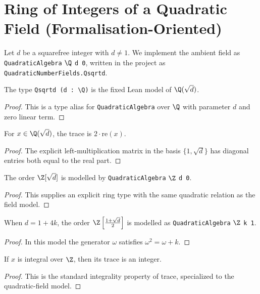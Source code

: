 \chapter{Ring of Integers of a Quadratic Field (Formalisation-Oriented)}

Let $d$ be a squarefree integer with $d \neq 1$.
We implement the ambient field as
\verb|QuadraticAlgebra| $\Q$ \verb|d 0|,
written in the project as \verb|QuadraticNumberFields.Qsqrtd|.

\begin{definition}\label{bp_qsqrtd}
  \leanok
  The type \verb|Qsqrtd (d : \Q)| is the fixed Lean model of $\Q(\sqrt{d})$.
\end{definition}
\begin{proof}
  This is a type alias for \verb|QuadraticAlgebra| over $\Q$ with parameter $d$
  and zero linear term.
\end{proof}

\begin{lemma}\label{bp_trace}
  \leanok
  For $x \in \Q(\sqrt{d})$, the trace is $2 \cdot \mathrm{re}(x)$.
\end{lemma}
\begin{proof}
  The explicit left-multiplication matrix in the basis $\{1, \sqrt{d}\}$ has
  diagonal entries both equal to the real part.
\end{proof}

\begin{definition}\label{bp_zsqrtd}
  \leanok
  The order $\Z[\sqrt{d}]$ is modelled by \verb|QuadraticAlgebra| $\Z$ \verb|d 0|.
\end{definition}
\begin{proof}
  This supplies an explicit ring type with the same quadratic relation as the
  field model.
\end{proof}

\begin{definition}\label{bp_zone}
  \leanok
  When $d = 1 + 4k$, the order
  $\Z\left[\frac{1+\sqrt{d}}{2}\right]$ is modelled as
  \verb|QuadraticAlgebra| $\Z$ \verb|k 1|.
\end{definition}
\begin{proof}
  In this model the generator $\omega$ satisfies $\omega^2 = \omega + k$.
\end{proof}

\begin{lemma}\label{bp_trace_int}
  \leanok
  If $x$ is integral over $\Z$, then its trace is an integer.
\end{lemma}
\begin{proof}
  This is the standard integrality property of trace, specialized to the
  quadratic-field model.
\end{proof}

